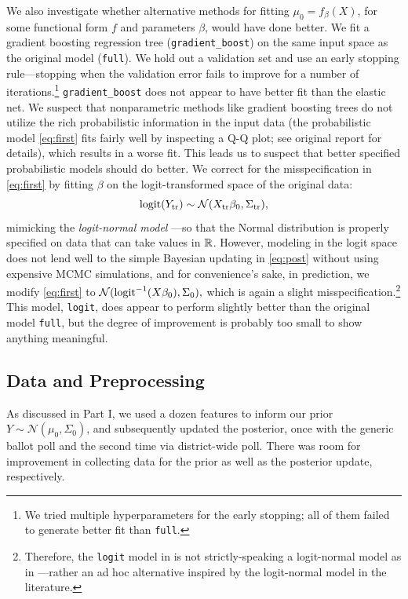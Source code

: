 \documentclass[12pt, letterpaper]{article}
\newcommand{\logit}{\operatorname{logit}}
\begin{document}
We also investigate whether alternative methods for fitting $\mu_0 = f_\beta(X)$, for some functional form $f$ and parameters $\beta$, would have done better. We fit a gradient boosting regression tree (\texttt{gradient\_boost}) on the same input space as the original model (\texttt{full}). We hold out a validation set and use an early stopping rule---stopping when the validation error fails to improve for a number of iterations.\footnote{We tried multiple hyperparameters for the early stopping; all of them failed to generate better fit than \texttt{full}.} \texttt{gradient\_boost} does not appear to have better fit than the elastic net. We suspect that nonparametric methods like gradient boosting trees do not utilize the rich probabilistic information in the input data (the probabilistic model \eqref{eq:first} fits fairly well by inspecting a Q-Q plot; see original report for details), which results in a worse fit. This leads us to suspect that better specified probabilistic models should do better. We correct for the misspecification in \eqref{eq:first} by fitting $\beta$ on the logit-transformed space of the original data: \[
\logit(Y_\text{tr}) \sim \Norm(X_\text{tr}\beta_0, \Sigma_\text{tr}),
\]
mimicking the \emph{logit-normal model} \cite[page 283]{agresti2015foundations}---so that the Normal distribution is properly specified on data that can take values in $\mathbb{R}$. However, modeling in the logit space does not lend well to the simple Bayesian updating in \eqref{eq:post} without using expensive MCMC simulations, and for convenience's sake, in prediction, we modify \eqref{eq:first} to $\Norm(\logit^{-1}(X\beta_0), \Sigma_0),$ which is again a slight misspecification.\footnote{Therefore, the \texttt{logit} model in  is not strictly-speaking a logit-normal model as in \cite{agresti2015foundations}---rather an ad hoc alternative inspired by the logit-normal model in the literature.} This model, \texttt{logit}, does appear to perform slightly better than the original model \texttt{full}, but the degree of improvement is probably too small to show anything meaningful.  


\subsection{Data and Preprocessing}
As discussed in Part I, we used a dozen features to inform our prior $Y \sim \mathcal{N}(\mu_0, \Sigma_0)$, and subsequently updated the posterior, once with the generic ballot poll and the second time via district-wide poll. There was room for improvement in collecting data for the prior as well as the posterior update, respectively.
\end{document}
